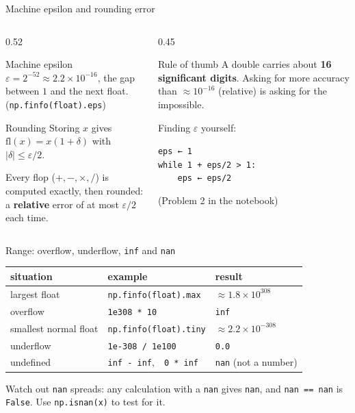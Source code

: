 \documentclass[aspectratio=169]{beamer}
\begin{document}
\begin{frame}{Machine epsilon and rounding error}
\begin{columns}[T]
\begin{column}{0.52\textwidth}
\begin{block}{Machine epsilon}
$\varepsilon = 2^{-52} \approx 2.2 \times 10^{-16}$, the gap between $1$ and the next float.\\[2pt]
\small (\texttt{np.finfo(float).eps})
\end{block}
\begin{block}{Rounding}
Storing $x$ gives $\mathrm{fl}(x) = x(1+\delta)$ with $|\delta| \le \varepsilon/2$.
\end{block}
\small Every flop ($+,-,\times,/$) is computed exactly, then rounded: a \textbf{relative} error of at most $\varepsilon/2$ each time.
\end{column}
\begin{column}{0.45\textwidth}
\begin{exampleblock}{Rule of thumb}
\small A double carries about \textbf{16 significant digits}. Asking for more accuracy than $\approx10^{-16}$ (relative) is asking for the impossible.
\end{exampleblock}
\vspace{0.2cm}
\small Finding $\varepsilon$ yourself:
\begin{center}
\texttt{eps ← 1}\\
\texttt{while 1 + eps/2 > 1:}\\
\texttt{\ \ \ \ eps ← eps/2}
\end{center}
\scriptsize (Problem 2 in the notebook)
\end{column}
\end{columns}
\end{frame}

\begin{frame}{Range: overflow, underflow, \texttt{inf} and \texttt{nan}}
\centering
\small
\begin{tabular}{lll}
\toprule
situation & example & result \\
\midrule
largest float & \texttt{np.finfo(float).max} & $\approx 1.8\times10^{308}$ \\
overflow & \texttt{1e308 * 10} & \texttt{inf} \\
smallest normal float & \texttt{np.finfo(float).tiny} & $\approx 2.2\times10^{-308}$ \\
underflow & \texttt{1e-308 / 1e100} & \texttt{0.0} \\
undefined & \texttt{inf - inf},\ \ \texttt{0 * inf} & \texttt{nan} (not a number) \\
\bottomrule
\end{tabular}

\vspace{0.4cm}
\begin{alertblock}{Watch out}
\texttt{nan} spreads: any calculation with a \texttt{nan} gives \texttt{nan}, and \texttt{nan == nan} is \texttt{False}. Use \texttt{np.isnan(x)} to test for it.
\end{alertblock}
\end{frame}
\end{document}
